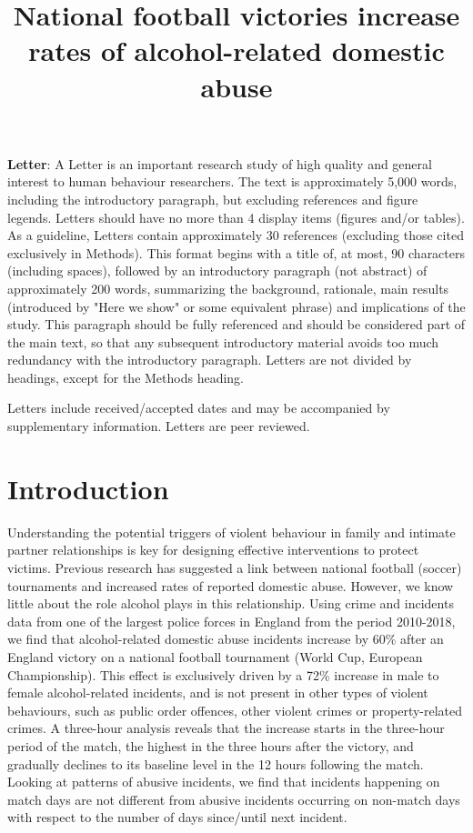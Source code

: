 \documentclass[12pt, letterpaper]{article}
\begin{document}
\title{National football victories increase rates of alcohol-related domestic abuse}
\textbf{Letter}:
A Letter is an important research study of high quality and general interest to human behaviour researchers.  The text is approximately 5,000 words, including the introductory paragraph, but excluding references and figure legends. Letters should have no more than 4 display items (figures and/or tables). As a guideline, Letters contain approximately 30 references (excluding those cited exclusively in Methods). This format begins with a title of, at most, 90 characters (including spaces), followed by an introductory paragraph (not abstract) of approximately 200 words, summarizing the background, rationale, main results (introduced by "Here we show" or some equivalent phrase) and implications of the study. This paragraph should be fully referenced and should be considered part of the main text, so that any subsequent introductory material avoids too much redundancy with the introductory paragraph. Letters are not divided by headings, except for the Methods heading.

Letters include received/accepted dates and may be accompanied by supplementary information. Letters are peer reviewed.


\maketitle

\section{Introduction}

Understanding the potential triggers of violent behaviour in family and intimate partner relationships is key for designing effective interventions to protect victims. Previous research has suggested a link between national football (soccer) tournaments and increased rates of reported domestic abuse. However, we know little about the role alcohol plays in this relationship. Using crime and incidents data from one of the largest police forces in England from the period 2010-2018, we find that alcohol-related domestic abuse incidents increase by 60\% after an England victory on a national football tournament (World Cup, European Championship). This effect is exclusively driven by a 72\% increase in male to female alcohol-related incidents, and is not present in other types of violent behaviours, such as public order offences, other violent crimes or property-related crimes. A three-hour analysis reveals that the increase starts in the three-hour period of the match, the highest in the three hours after the victory, and gradually declines to its baseline level in the 12 hours following the match. Looking at patterns of abusive incidents, we find that incidents happening on match days are not different from abusive incidents occurring on non-match days with respect to the number of days since/until next incident.
\end{document}

